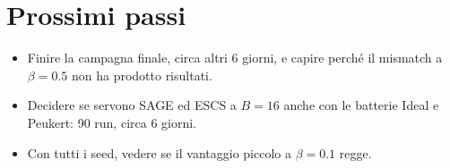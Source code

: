 \documentclass[10pt,a4paper]{article}
\begin{document}
\section{Prossimi passi}

\begin{itemize}
  \item Finire la campagna finale, circa altri 6 giorni, e capire perché il
        mismatch a $\beta = 0.5$ non ha prodotto risultati.
  \item Decidere se servono SAGE ed ESCS a $B = 16$ anche con le batterie Ideal
        e Peukert: 90 run, circa 6 giorni.
  \item Con tutti i seed, vedere se il vantaggio piccolo a $\beta = 0.1$ regge.
\end{itemize}
\end{document}
